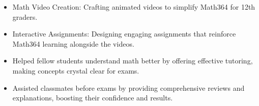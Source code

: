\documentclass[10pt,a4paper,ragged2e,withhyper]{altacv}
\begin{document}
\begin{paracol}{2}





\begin{itemize}
\item Math Video Creation: Crafting animated videos to simplify Math364 for 12th graders.
\item Interactive Assignments: Designing engaging assignments that reinforce Math364 learning alongside the videos.
\end{itemize}
\divider

\begin{itemize}
\item Helped fellow students understand math better by offering effective tutoring, making concepts crystal clear for exams.
\item Assisted classmates before exams by providing comprehensive reviews and explanations, boosting their confidence and results.
\end{itemize}








\newpage

\end{paracol}
\end{document}
